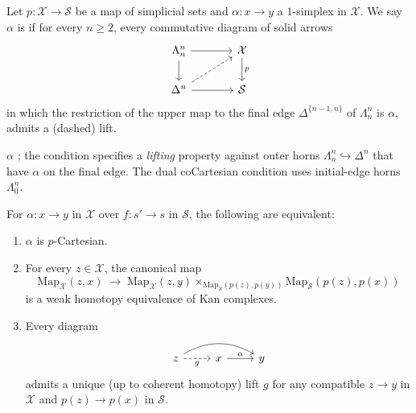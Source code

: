 \begin{definition}
\label{def:p-cartesian}
Let $p : \mathcal{X} \to \mathcal{S}$ be a map of simplicial sets and
$\alpha : x \to y$ a $1$-simplex in $\mathcal{X}$. We say $\alpha$ is
 if for every $n \geq 2$, every commutative diagram
of solid arrows
\begin{equation*}
  \begin{tikzcd}[column sep=large]
    \Lambda^n_n \arrow[r] \arrow[d] & \mathcal{X} \arrow[d, "p"] \\
    \Delta^n \arrow[r] \arrow[ur, dashed] & \mathcal{S}
  \end{tikzcd}
\end{equation*}
in which the restriction of the upper map to the final edge $\Delta^{\{n-1,
n\}}$ of $\Lambda^n_n$ is $\alpha$, admits a (dashed) lift.
\end{definition}

\begin{howtosay}
$\alpha$ ; the
condition specifies a \emph{lifting} property against outer horns
$\Lambda^n_n \hookrightarrow \Delta^n$ that have $\alpha$ on the final
edge. The dual coCartesian condition uses initial-edge horns
$\Lambda^n_0$.
\end{howtosay}

\begin{theorem}
\label{thm:cartesian-equiv}
For $\alpha : x \to y$ in $\mathcal{X}$ over $f : s' \to s$ in
$\mathcal{S}$, the following are equivalent:
\begin{enumerate}
  \item $\alpha$ is $p$-Cartesian.
  \item For every $z \in \mathcal{X}$, the canonical map
        \begin{equation*}
          \mathrm{Map}_\mathcal{X}(z, x) \;\longrightarrow\;
          \mathrm{Map}_\mathcal{X}(z, y) \times_{\mathrm{Map}_\mathcal{S}(p(z), p(y))} \mathrm{Map}_\mathcal{S}(p(z), p(x))
        \end{equation*}
        is a weak homotopy equivalence of Kan complexes.
  \item Every diagram
        \begin{equation*}
          \begin{tikzcd}
            z \arrow[rr, bend left] \arrow[r, dashed, "g"'] & x \arrow[r, "\alpha"] & y
          \end{tikzcd}
        \end{equation*}
        admits a unique (up to coherent homotopy) lift $g$ for any
        compatible $z \to y$ in $\mathcal{X}$ and $p(z) \to p(x)$ in
        $\mathcal{S}$.
\end{enumerate}
\end{theorem}

